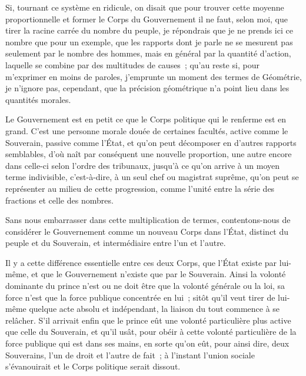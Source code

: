 \documentclass[french,twoside]{book} %
\begin{document}
Si, tournant ce système en ridicule, on disait que pour trouver cette moyenne proportionnelle et former le Corps du Gouvernement il ne faut, selon moi, que tirer la racine carrée du nombre du peuple, je répondrais que je ne prends ici ce nombre que pour un exemple, que les rapports dont je parle ne se mesurent pas seulement par le nombre des hommes, mais en général par la quantité d’action, laquelle se combine par des multitudes de causes ; qu’au reste si, pour m’exprimer en moins de paroles, j’emprunte un moment des termes de Géométrie, je n’ignore pas, cependant, que la précision géométrique n’a point lieu dans les quantités morales.\par
Le Gouvernement est en petit ce que le Corps politique qui le renferme est en grand. C’est une personne morale douée de certaines facultés, active comme le Souverain, passive comme l’État, et qu’on peut décomposer en d’autres rapports semblables, d’où naît par conséquent une nouvelle proportion, une autre encore dans celle-ci selon l’ordre des tribunaux, jusqu’à ce qu’on arrive à un moyen terme indivisible, c’est-à-dire, à un seul chef ou magistrat suprême, qu’on peut se représenter au milieu de cette progression, comme l’unité entre la série des fractions et celle des nombres.\par
Sans nous embarrasser dans cette multiplication de termes, contentons-nous de considérer le Gouvernement comme un nouveau Corps dans l’État, distinct du peuple et du Souverain, et intermédiaire entre l’un et l’autre.\par
Il y a cette différence essentielle entre ces deux Corps, que l’État existe par lui-même, et que le Gouvernement n’existe que par le Souverain. Ainsi la volonté dominante du prince n’est ou ne doit être que la volonté générale ou la loi, sa force n’est que la force publique concentrée en lui ; sitôt qu’il veut tirer de lui-même quelque acte absolu et indépendant, la liaison du tout commence à se relâcher. S’il arrivait enfin que le prince eût une volonté particulière plus active que celle du Souverain, et qu’il usât, pour obéir à cette volonté particulière de la force publique qui est dans ses mains, en sorte qu’on eût, pour ainsi dire, deux Souverains, l’un de droit et l’autre de fait ; à l’instant l’union sociale s’évanouirait et le Corps politique serait dissout.\par
\end{document}
